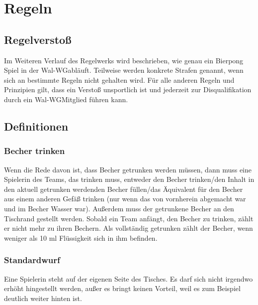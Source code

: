 \documentclass[a5paper, 12pt]{book}
\begin{document}
\tableofcontents
\cleardoublepage
{}
\part {Regeln}\label{part:regeln}
\chapter*{Regelverstoß}\label{chap:regelverstoß}
Im Weiteren Verlauf des Regelwerks wird beschrieben, wie genau ein Bierpong Spiel in der Wal-WG\texttrademark abläuft. Teilweise werden konkrete Strafen genannt, wenn sich an bestimmte Regeln nicht gehalten wird. Für alle anderen Regeln und Prinzipien gilt, dass ein Verstoß unsportlich ist und jederzeit zur Disqualifikation durch ein Wal-WG\texttrademark Mitglied führen kann. 

\chapter{Definitionen} \label{chap:definitionen}
\section{Becher trinken} \label{sec:bechertrinken}
Wenn die Rede davon ist, dass Becher getrunken werden müssen, dann muss eine Spielerin des Teams, das trinken muss, entweder den Becher trinken/den Inhalt in den aktuell getrunken werdenden Becher füllen/das Äquivalent für den Becher aus einem anderen Gefäß trinken (nur wenn das von vornherein abgemacht war und im Becher Wasser war). Außerdem muss der getrunkene Becher an den Tischrand gestellt werden. Sobald ein Team anfängt, den Becher zu trinken, zählt er nicht mehr zu ihren Bechern. Als vollständig getrunken zählt der Becher, wenn weniger als 10 ml Flüssigkeit sich in ihm befinden.
\section{Standardwurf}\label{sec:standardwurf} 
Eine Spielerin steht auf der eigenen Seite des Tisches. Es darf sich nicht irgendwo erhöht hingestellt werden, außer es bringt keinen Vorteil, weil es zum Beispiel deutlich weiter hinten ist. 
\end{document}
